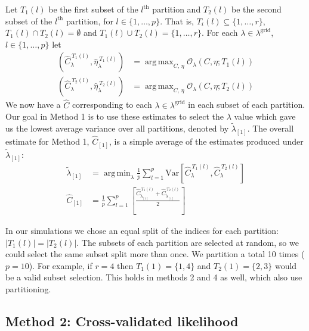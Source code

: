 \documentclass[oupdraft]{bio}
\DeclareMathOperator*{\argmin}{arg\,min}
\DeclareMathOperator*{\argmax}{arg\,max}
\newcommand{\lambdagrid}{\lambda^{\text{grid}}}
\begin{document}
Let $T_1(l)$ be the first subset of the $l^{\text{th}}$ partition and $T_2(l)$ be the second subset of the $l^{\text{th}}$ partition, for $l \in \{1, \dots , p\}$. That is, $T_i(l) \subseteq \{1, \dots , r\}$, $T_1(l) \cap T_2(l) = \emptyset$ and $T_1(l) \cup T_2(l) = \{1, \dots ,r\}$.
For each $\lambda \in \lambda^{\text{grid}}$, $l \in \{1, \dots, p\}$ let
\begin{align}
\left(\widehat{C}_{\lambda}^{ \ T_1(l)}, \widehat{\eta}_{\lambda}^{ \ T_1(l)} \right) &= \argmax_{C, \, \eta} \mathcal{O}_\lambda \left(C, \eta; T_1(l) \right) \\
\left(\widehat{C}_{\lambda}^{ \ T_2(l)}, \widehat{\eta}_{\lambda}^{ \ T_2(l)} \right) &= \argmax_{C, \, \eta} \mathcal{O}_\lambda \left(C, \eta; T_2(l) \right)
\end{align}
We now have a $\widehat{C}$ corresponding to each $\lambda \in \lambdagrid$ in each subset of each partition.  Our goal in Method 1 is to use these estimates to select the $\lambda$ value which gave us the lowest average variance over all partitions, denoted by $\widetilde{\lambda}_{[1]}$.  The overall estimate for Method 1, $\widehat{C}_{[1]}$, is a simple average of the estimates produced under $\widetilde{\lambda}_{[1]}$:
\begin{align}
\widetilde{\lambda}_{[1]} &= \argmin_{\lambda} \frac{1}{p} \sum_{l=1}^p \text{Var}\left[ \widehat{C}_{\lambda}^{ \ T_1(l)}, \widehat{C}_{\lambda}^{ \ T_2(l)} \right] \\
\widehat{C}_{[1]} &=  \frac{1}{p} \sum_{l=1}^p \left[ \frac{\widehat{C}_{\widetilde{\lambda}_{[1]}}^{ \ T_1(l)} + \widehat{C}_{\widetilde{\lambda}_{[1]}}^{ \ T_2(l)}}{2} \right]
\end{align}

In our simulations we chose an equal split of the indices for each partition: $|T_1(l)| = |T_2(l)|$.  The subsets of each partition are selected at random, so we could select the same subset split more than once.  We partition a total 10 times ($p = 10$).  For example, if $r = 4$ then $T_1(1) = \{1,4\}$ and $T_2(1) = \{2, 3\}$ would be a valid subset selection.  This holds in methods 2 and 4 as well, which also use partitioning.

\subsection{Method 2: Cross-validated likelihood}

\end{document}
